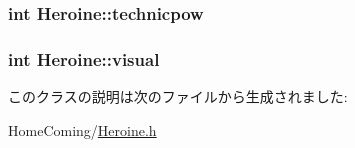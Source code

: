 \hypertarget{class_heroine_a7456ab0e6a903a4463791122bd3f2d77}{
\subsubsection[{technicpow}]{\setlength{\rightskip}{0pt plus 5cm}int {\bf Heroine\-::technicpow}}}\label{class_heroine_a7456ab0e6a903a4463791122bd3f2d77}
\hypertarget{class_heroine_a2e514d4fc23f767db26d784c68b873aa}{
\subsubsection[{visual}]{\setlength{\rightskip}{0pt plus 5cm}int {\bf Heroine\-::visual}}}\label{class_heroine_a2e514d4fc23f767db26d784c68b873aa}


このクラスの説明は次のファイルから生成されました\-:\begin{DoxyCompactItemize}
\item 
Home\-Coming/\hyperlink{_heroine_8h}{Heroine.\-h}\end{DoxyCompactItemize}
